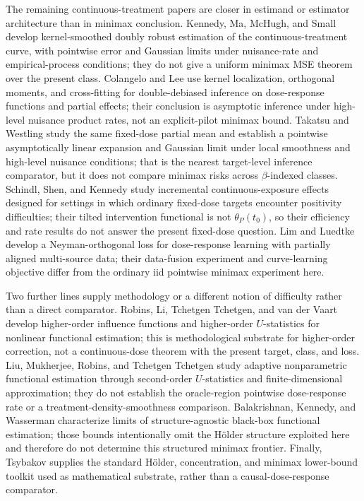 \documentclass{article}
\begin{document}
The remaining continuous-treatment papers are closer in estimand or estimator architecture than in minimax conclusion. Kennedy, Ma, McHugh, and Small develop kernel-smoothed doubly robust estimation of the continuous-treatment curve, with pointwise error and Gaussian limits under nuisance-rate and empirical-process conditions; they do not give a uniform minimax MSE theorem over the present class. Colangelo and Lee use kernel localization, orthogonal moments, and cross-fitting for double-debiased inference on dose-response functions and partial effects; their conclusion is asymptotic inference under high-level nuisance product rates, not an explicit-pilot minimax bound. Takatsu and Westling study the same fixed-dose partial mean and establish a pointwise asymptotically linear expansion and Gaussian limit under local smoothness and high-level nuisance conditions; that is the nearest target-level inference comparator, but it does not compare minimax risks across \(\beta\)-indexed classes. Schindl, Shen, and Kennedy study incremental continuous-exposure effects designed for settings in which ordinary fixed-dose targets encounter positivity difficulties; their tilted intervention functional is not \(\theta_P(t_0)\), so their efficiency and rate results do not answer the present fixed-dose question. Lim and Luedtke develop a Neyman-orthogonal loss for dose-response learning with partially aligned multi-source data; their data-fusion experiment and curve-learning objective differ from the ordinary iid pointwise minimax experiment here.

Two further lines supply methodology or a different notion of difficulty rather than a direct comparator. Robins, Li, Tchetgen Tchetgen, and van der Vaart develop higher-order influence functions and higher-order \(U\)-statistics for nonlinear functional estimation; this is methodological substrate for higher-order correction, not a continuous-dose theorem with the present target, class, and loss. Liu, Mukherjee, Robins, and Tchetgen Tchetgen study adaptive nonparametric functional estimation through second-order \(U\)-statistics and finite-dimensional approximation; they do not establish the oracle-region pointwise dose-response rate or a treatment-density-smoothness comparison. Balakrishnan, Kennedy, and Wasserman characterize limits of structure-agnostic black-box functional estimation; those bounds intentionally omit the H\"older structure exploited here and therefore do not determine this structured minimax frontier. Finally, Tsybakov supplies the standard H\"older, concentration, and minimax lower-bound toolkit used as mathematical substrate, rather than a causal-dose-response comparator.
\end{document}
